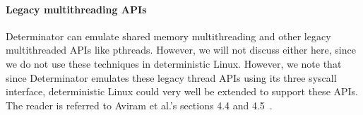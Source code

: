 \paragraph{Legacy multithreading APIs}
Determinator can emulate shared memory multithreading and other legacy
multithreaded APIs like pthreads. However, we will not discuss either here,
since we do not use these techniques in deterministic Linux. However, we note
that since Determinator emulates these legacy thread APIs using its three
syscall interface, deterministic Linux could very well be extended to support
these APIs. The reader is referred to Aviram et al.'s sections 4.4 and
4.5~\cite{Aviram10}.

\endinput

